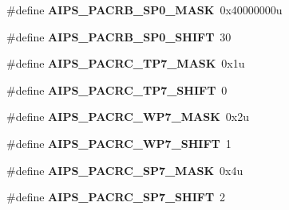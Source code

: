 \begin{DoxyCompactItemize}
\item 
\hypertarget{group___a_i_p_s___register___masks_ga8c4083394fd1c5a1bdf0f5e75a3eada3}{}\#define {\bfseries A\+I\+P\+S\+\_\+\+P\+A\+C\+R\+B\+\_\+\+S\+P0\+\_\+\+M\+A\+S\+K}~0x40000000u\label{group___a_i_p_s___register___masks_ga8c4083394fd1c5a1bdf0f5e75a3eada3}

\item 
\hypertarget{group___a_i_p_s___register___masks_gacc4da8bd7ed1f2724720ba203ab6a7a1}{}\#define {\bfseries A\+I\+P\+S\+\_\+\+P\+A\+C\+R\+B\+\_\+\+S\+P0\+\_\+\+S\+H\+I\+F\+T}~30\label{group___a_i_p_s___register___masks_gacc4da8bd7ed1f2724720ba203ab6a7a1}

\item 
\hypertarget{group___a_i_p_s___register___masks_gaaa21e842a3c19740ed5519be7f4174b8}{}\#define {\bfseries A\+I\+P\+S\+\_\+\+P\+A\+C\+R\+C\+\_\+\+T\+P7\+\_\+\+M\+A\+S\+K}~0x1u\label{group___a_i_p_s___register___masks_gaaa21e842a3c19740ed5519be7f4174b8}

\item 
\hypertarget{group___a_i_p_s___register___masks_ga308aea1570514208ec613685bee78edd}{}\#define {\bfseries A\+I\+P\+S\+\_\+\+P\+A\+C\+R\+C\+\_\+\+T\+P7\+\_\+\+S\+H\+I\+F\+T}~0\label{group___a_i_p_s___register___masks_ga308aea1570514208ec613685bee78edd}

\item 
\hypertarget{group___a_i_p_s___register___masks_ga67823a6b21a06114e32e26ea29415584}{}\#define {\bfseries A\+I\+P\+S\+\_\+\+P\+A\+C\+R\+C\+\_\+\+W\+P7\+\_\+\+M\+A\+S\+K}~0x2u\label{group___a_i_p_s___register___masks_ga67823a6b21a06114e32e26ea29415584}

\item 
\hypertarget{group___a_i_p_s___register___masks_ga21e6d7b747221c4d639a7218ff81518b}{}\#define {\bfseries A\+I\+P\+S\+\_\+\+P\+A\+C\+R\+C\+\_\+\+W\+P7\+\_\+\+S\+H\+I\+F\+T}~1\label{group___a_i_p_s___register___masks_ga21e6d7b747221c4d639a7218ff81518b}

\item 
\hypertarget{group___a_i_p_s___register___masks_ga7b776de1ddc5bf087143ce5bb1b223ea}{}\#define {\bfseries A\+I\+P\+S\+\_\+\+P\+A\+C\+R\+C\+\_\+\+S\+P7\+\_\+\+M\+A\+S\+K}~0x4u\label{group___a_i_p_s___register___masks_ga7b776de1ddc5bf087143ce5bb1b223ea}

\item 
\hypertarget{group___a_i_p_s___register___masks_ga834e8924a2699a9095496bc215bcab92}{}\#define {\bfseries A\+I\+P\+S\+\_\+\+P\+A\+C\+R\+C\+\_\+\+S\+P7\+\_\+\+S\+H\+I\+F\+T}~2\label{group___a_i_p_s___register___masks_ga834e8924a2699a9095496bc215bcab92}


\end{DoxyCompactItemize}
